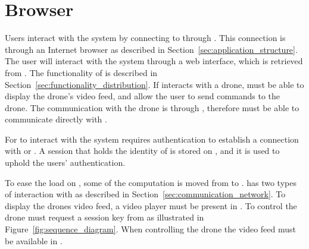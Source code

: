 \section{Browser}
\label{sec:design_client}
Users interact with the system by connecting to  through .
This connection is through an Internet browser as described in Section~\ref{sec:application_structure}.
The user will interact with the system through a web interface, which is retrieved from .
The functionality of  is described in Section~\ref{sec:functionality_distribution}.
If  interacts with a drone,  must be able to display the drone's video feed, and allow the user to send commands to the drone.
The communication with the drone is through , therefore  must be able to communicate directly with .

For  to interact with the system requires authentication to establish a connection with  or . %
A session that holds the identity of  is stored on , and it is used to uphold the users' authentication. %

To ease the load on , some of the computation is moved from  to .
 has two types of interaction with  as described in Section~\ref{sec:communication_network}.
To display the drones video feed, a video player must be present in .
To control the drone  must request a session key from  as illustrated in Figure~\ref{fig:sequence_diagram}.
When controlling the drone the video feed must be available in .



